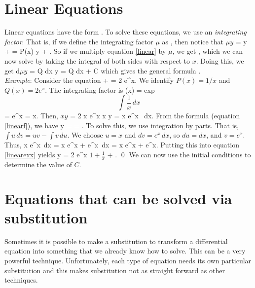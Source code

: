 \documentclass[12pt]{book}
\begin{document}
\section{Linear Equations}

Linear equations have the form
\be \label{linear}
.
\ee
To solve these equations, we use an \emph{integrating factor}. That is, if
we define the integrating factor $\mu$ as
\be
{},
\ee
then notice that
\bee
  \(\mu y \) =  y + \mu {} 
  = \mu P(x) y + \mu {}.
\eee
So if we multiply equation \eqref{linear} by $\mu$, we get
\be
{},
\ee
which we can now solve by taking the integral of both sides with respect to 
$x$. Doing this, we get
\bee
  d\(\mu y\) = \mu Q dx \qquad \implies \qquad
  \mu y = \int \mu Q dx + C
\eee
which gives the general formula
\be
\label{linearf}
.
\ee
\\

\noindent \emph{Example}:
\label{linearsec}
Consider the equation
\bee
   +  = 2 e^x.
\eee
We identify $P(x)=1/x$ and $Q(x)=2e^x$. The integrating factor is
\bee
  \mu(x) = \mbox{exp}\[\int \frac{1}{x} \, dx \] = e^{\ln x} = x.
\eee
Then,
\be \label{linearex}
   \(x y \) = 2 x e^x
  \quad \implies \quad
  x y =  x e^x \, dx. 
\ee
From the formula (equation \eqref{linearf}), we have
\be
\label{linearexx}
y =  = .
\ee
To solve this, we use integration by parts. That is, 
$\int u \, dv = uv - \int v\,  du$. We choose $u=x$ and $dv = e^x \, dx$, so
$du = dx$, and $v=e^x$. Thus,
\bee
  \int x e^x \,dx = x e^x + \int e^x \,dx = x e^x + e^x.
\eee
Putting this into equation \eqref{linearexx} yields
\bee
  y = 2 e^x \(1 + \frac{1}{x}\) + . \qed
\eee
We can now use the initial conditions to determine the value of $C$.





\section{Equations that can be solved via substitution}

Sometimes it is possible to make a substitution to transform a differential 
equation into something that we already know how to solve. This can be a very 
powerful technique. Unfortunately, each type of equation needs its own 
particular substitution and this makes substitution not as straight forward as 
other techniques.
\end{document}
